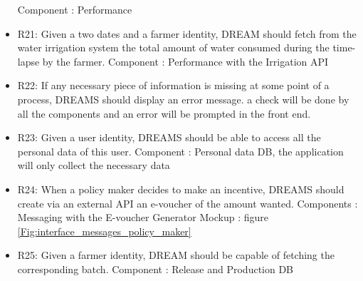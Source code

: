 \begin{itemize}
	\subitem Component : Performance
	\item
	R21: Given a two dates and a farmer identity, DREAM should fetch from the water irrigation system the total amount of water consumed during the time-lapse by the farmer.
	\subitem Component : Performance with the Irrigation API
	\item
	R22: If any necessary piece of information is missing at some point of a process, DREAMS should display an error message.
	\subitem a check will be done by all the components and an error will be prompted in the front end.
	\item
	R23: Given a user identity, DREAMS should be able to access all the personal data of this user.
	\subitem Component : Personal data DB, the application will only collect the necessary data
	\item
	R24: When a policy maker decides to make an incentive, DREAMS should create via an external API an e-voucher of the amount wanted. 
	\subitem Components : Messaging with the E-voucher Generator
	\subitem Mockup : figure \ref{Fig:interface_messages_policy_maker}
	\item
	R25: Given a farmer identity, DREAM should be capable of fetching the corresponding batch.
	\subitem Component : Release and Production DB
	
\end{itemize}